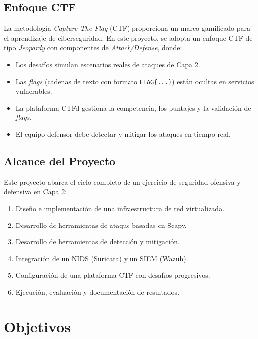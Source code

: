 \documentclass[12pt, a4paper]{article}
\begin{document}
\subsection{Enfoque CTF}

La metodolog\'ia \textit{Capture The Flag} (CTF) proporciona un marco gamificado para el aprendizaje de ciberseguridad. En este proyecto, se adopta un enfoque CTF de tipo \textit{Jeopardy} con componentes de \textit{Attack/Defense}, donde:

\begin{itemize}[leftmargin=2cm]
    \item Los desaf\'ios simulan escenarios reales de ataques de Capa 2.
    \item Las \textit{flags} (cadenas de texto con formato \texttt{FLAG\{...\}}) est\'an ocultas en servicios vulnerables.
    \item La plataforma CTFd gestiona la competencia, los puntajes y la validaci\'on de \textit{flags}.
    \item El equipo defensor debe detectar y mitigar los ataques en tiempo real.
\end{itemize}

\subsection{Alcance del Proyecto}

Este proyecto abarca el ciclo completo de un ejercicio de seguridad ofensiva y defensiva en Capa 2:

\begin{enumerate}[leftmargin=2cm]
    \item Dise\~no e implementaci\'on de una infraestructura de red virtualizada.
    \item Desarrollo de herramientas de ataque basadas en Scapy.
    \item Desarrollo de herramientas de detecci\'on y mitigaci\'on.
    \item Integraci\'on de un NIDS (Suricata) y un SIEM (Wazuh).
    \item Configuraci\'on de una plataforma CTF con desaf\'ios progresivos.
    \item Ejecuci\'on, evaluaci\'on y documentaci\'on de resultados.
\end{enumerate}

\newpage

\section{Objetivos}
\end{document}
